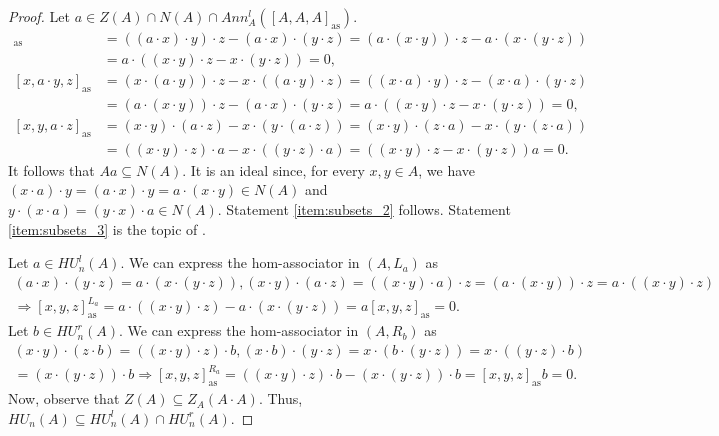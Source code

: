 \documentclass[12pt]{article}
\begin{document}
		\begin{proof}
			Let $a\in Z(A)\cap N(A)\cap Ann_A^l([A,A,A]_{\mathrm{as}})$.
			\begin{align*}
				[a\cdot x,y,z]_{\mathrm{as}}&=((a\cdot x)\cdot y)\cdot z-(a\cdot x)\cdot (y\cdot z)=(a\cdot (x\cdot y))\cdot z-a\cdot (x\cdot (y\cdot z))\\
				&=a\cdot ((x\cdot y)\cdot z-x\cdot (y\cdot z))=0,\\
				[x,a\cdot y,z]_{\mathrm{as}}&=(x\cdot (a\cdot y))\cdot z-x\cdot ((a\cdot y)\cdot z)=((x\cdot a)\cdot y)\cdot z-(x\cdot a)\cdot (y\cdot z)\\
				&=(a\cdot (x\cdot y))\cdot z-(a\cdot x)\cdot (y\cdot z)=a\cdot ((x\cdot y)\cdot z-x\cdot (y\cdot z))=0,\\
				[x,y,a\cdot z]_{\mathrm{as}}&=(x\cdot y)\cdot (a\cdot z)-x\cdot (y\cdot (a\cdot z))=(x\cdot y)\cdot (z\cdot a)-x\cdot (y\cdot (z\cdot a))\\
				&=((x\cdot y)\cdot z)\cdot a-x\cdot ((y\cdot z)\cdot a)=((x\cdot y)\cdot z-x\cdot (y\cdot z))a=0.
			\end{align*}
			It follows that $Aa\subseteq N(A)$. It is an ideal since, for every $x,y\in A$, we have $(x\cdot a)\cdot y=(a\cdot x)\cdot y=a\cdot (x\cdot y)\in N(A)$ and $y\cdot (x\cdot a)=(y\cdot x)\cdot a\in N(A)$. Statement \ref{item:subsets_2} follows. Statement \ref{item:subsets_3} is the topic of \cite{FreGohr:UnitCond}.
			
			Let $a\in HU_n^l(A)$. We can express the hom-associator in $(A,L_a)$ as
			\begin{multline*}
				(a\cdot x)\cdot (y\cdot z)=a\cdot (x\cdot (y\cdot z)), (x\cdot y)\cdot (a\cdot z)=((x\cdot y)\cdot a)\cdot z=(a\cdot (x\cdot y))\cdot z=a\cdot ((x\cdot y)\cdot z) \\
				\Rightarrow [x,y,z]_{\mathrm{as}}^{L_a}=a\cdot ((x\cdot y)\cdot z)-a\cdot (x\cdot (y\cdot z))=a[x,y,z]_{\mathrm{as}}=0.
			\end{multline*}
			Let $b\in HU_n^r(A)$. We can express the hom-associator in $(A,R_b)$ as
			\begin{multline*}
				(x\cdot y)\cdot (z\cdot b)=((x\cdot y)\cdot z)\cdot b, (x\cdot b)\cdot (y\cdot z)=x\cdot (b\cdot (y\cdot z))=x\cdot ((y\cdot z)\cdot b)\\
				=(x\cdot (y\cdot z))\cdot b
				\Rightarrow [x,y,z]_{\mathrm{as}}^{R_a}=((x\cdot y)\cdot z)\cdot b-(x\cdot (y\cdot z))\cdot b=[x,y,z]_{\mathrm{as}}b=0.
			\end{multline*}
			Now, observe that $Z(A)\subseteq Z_A(A\cdot A)$. Thus, $HU_n(A)\subseteq HU_n^l(A)\cap HU_n^r(A)$.
			

\end{proof}
\end{document}
